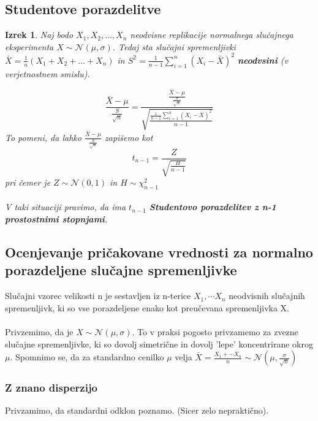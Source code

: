 \documentclass[11pt]{article}
\newtheorem{Izrek}{{\sc Izrek}}[section]
\begin{document}
\subsection{Studentove porazdelitve}
\begin{Izrek}
	Naj bodo  $X_1, X_2, \ldots , X_n$ neodvisne replikacije normalnega slučajnega eksperimenta $X\sim \mathcal{N}(\mu,\sigma)$. Tedaj sta slučajni spremenljivki $\bar{X} = \frac{1}{n}(X_1 + X_2 + \ldots + X_n)$ in $S^2 =\frac{1}{n-1}\sum_{i = 1}^{n}{(X_i - \bar{X})^2}$ \textbf{neodvsini} (v verjetnostnem smislu).
	
	$$\frac{\bar{X}-\mu}{\frac{S}{\sqrt{n}}} = \frac{\frac{\bar{X}-\mu}{\frac{\sigma}{\sqrt{n}}}}{\sqrt{\frac{\frac{1}{n-1}\sum_{i = 1}^{n}{(X_i - \bar{X})^2}}{n-1}}}$$
	To pomeni, da lahko $\frac{\bar{X}-\mu}{\frac{S}{\sqrt{n}}}$ zapišemo kot $$t_{n-1} = \frac{Z}{\sqrt{\frac{H}{n-1}}}$$
	pri čemer je $Z\sim \mathcal{N}(0,1)$ in $H \sim \chi_{n-1}^2$
	\\
	\\
	V taki situaciji pravimo, da ima  $t_{n-1} $ \textbf{Studentovo porazdelitev z n-1 prostostnimi stopnjami}.
\end{Izrek}
\subsection{Ocenjevanje pričakovane vrednosti za normalno porazdeljene slučajne spremenljivke}
Slučajni vzorec velikosti n je sestavljen iz n-terice $X_1,\cdots X_n$ neodvisnih slučajnih spremenljivk, ki so vse porazdeljene enako kot preučevana spremenljivka X.
\\
\\
Privzemimo, da je $X\sim \mathcal{N}(\mu, \sigma)$. To v praksi pogosto privzamemo za zvezne slučajne spremenljivke, ki so dovolj simetrične in dovolj 'lepe' koncentrirane okrog $\mu$. Spomnimo se, da za standardno cenilko $\mu$ velja $\bar{X} = \frac{X_1 + \cdots X_n}{n}\sim \mathcal{N}(\mu, \frac{\sigma}{\sqrt{n}})$

\subsubsection{Z znano disperzijo}
Privzamimo, da standardni odklon poznamo. (Sicer zelo nepraktično).
\end{document}
